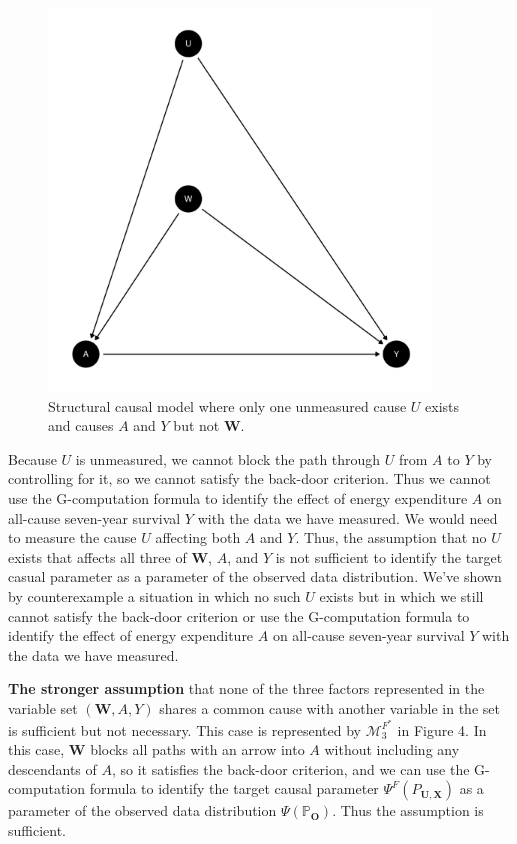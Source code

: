 \documentclass{article}\usepackage[]{graphicx}\usepackage[]{xcolor}
\newenvironment{knitrout}{}{} %
\begin{document}
\begin{figure}[H]
  \caption{Structural causal model where only one unmeasured cause $U$ exists and causes $A$ and $Y$ but not $\bm{W}$.}
  \centering

\begin{knitrout}
\color{fgcolor}
\includegraphics[width=4in]{figure/unnamed-chunk-7-1} 

\end{knitrout}

\end{figure}

Because $U$ is unmeasured, we cannot block the path through $U$ from $A$ to $Y$ by controlling for it, so we cannot satisfy the back-door criterion. Thus we cannot use the G-computation formula to identify the effect of energy expenditure $A$ on all-cause seven-year survival $Y$ with the data we have measured. We would need to measure the cause $U$ affecting both $A$ and $Y$. Thus, the assumption that no $U$ exists that affects all three of $\bm{W}$, $A$, and $Y$ is not sufficient to identify the target casual parameter as a parameter of the observed data distribution. We've shown by counterexample a situation in which no such $U$ exists but in which we still cannot satisfy the back-door criterion or use the G-computation formula to identify the effect of energy expenditure $A$ on all-cause seven-year survival $Y$ with the data we have measured.

\vspace{2mm}

\textbf{The stronger assumption} that none of the three factors represented in the variable set $(\bm{W}, A, Y)$ shares a common cause with another variable in the set is sufficient but not necessary. This case is represented by $\mathcal{M}^{F^*}_3$ in Figure 4. In this case, $\bm{W}$ blocks all paths with an arrow into $A$ without including any descendants of $A$, so it satisfies the back-door criterion, and we can use the G-computation formula to identify the target causal parameter $\Psi^F(P_{\bm{U},\bm{X}})$ as a parameter of the observed data distribution $\Psi(\mathbb{P}_{\bm{O}})$. Thus the assumption is sufficient.
\end{document}
